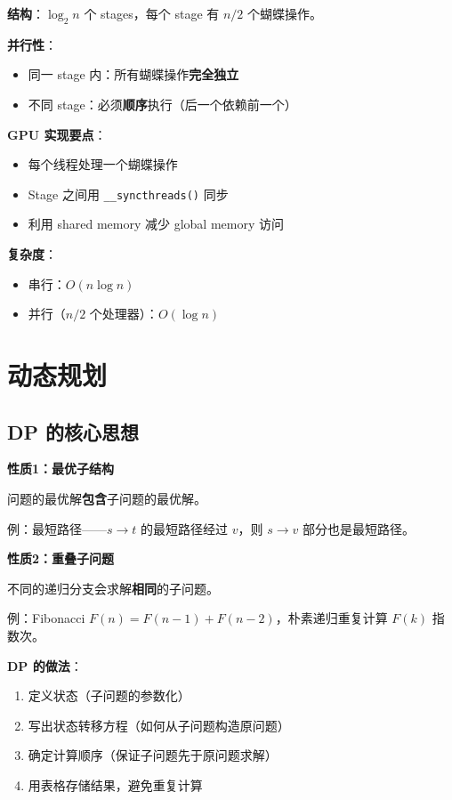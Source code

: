 \documentclass[12pt, a4paper]{ctexart}
\begin{document}
\begin{gpubox}

\textbf{结构}：$\log_2 n$ 个 stages，每个 stage 有 $n/2$ 个蝴蝶操作。

\textbf{并行性}：
\begin{itemize}
    \item 同一 stage 内：所有蝴蝶操作\textbf{完全独立}
    \item 不同 stage：必须\textbf{顺序}执行（后一个依赖前一个）
\end{itemize}

\textbf{GPU 实现要点}：
\begin{itemize}
    \item 每个线程处理一个蝴蝶操作
    \item Stage 之间用 \texttt{\_\_syncthreads()} 同步
    \item 利用 shared memory 减少 global memory 访问
\end{itemize}

\textbf{复杂度}：
\begin{itemize}
    \item 串行：$O(n \log n)$
    \item 并行（$n/2$ 个处理器）：$O(\log n)$
\end{itemize}

\end{gpubox}

\section{动态规划}

\subsection{DP 的核心思想}

\begin{blackboard}[动态规划的两个关键性质]

\textbf{性质1：最优子结构}

问题的最优解\textbf{包含}子问题的最优解。

例：最短路径——$s \to t$ 的最短路径经过 $v$，则 $s \to v$ 部分也是最短路径。

\textbf{性质2：重叠子问题}

不同的递归分支会求解\textbf{相同}的子问题。

例：Fibonacci $F(n) = F(n-1) + F(n-2)$，朴素递归重复计算 $F(k)$ 指数次。

\textbf{DP 的做法}：
\begin{enumerate}
    \item 定义状态（子问题的参数化）
    \item 写出状态转移方程（如何从子问题构造原问题）
    \item 确定计算顺序（保证子问题先于原问题求解）
    \item 用表格存储结果，避免重复计算
\end{enumerate}

\end{blackboard}
\end{document}
